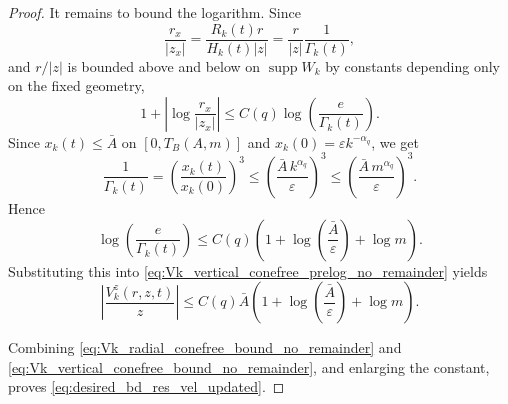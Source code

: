 \documentclass[reqno,11pt]{amsart}
\newcommand{\supp}{\operatorname{supp}}
\begin{document}
\begin{proof}
It remains to bound the logarithm. Since
\[
\frac{r_x}{|z_x|}
=
\frac{R_k(t)r}{H_k(t)|z|}
=
\frac{r}{|z|}\frac{1}{\Gamma_k(t)},
\]
and \(r/|z|\) is bounded above and below on \(\supp W_k\) by constants depending
only on the fixed geometry,
\[
1+\left|\log\frac{r_x}{|z_x|}\right|
\le
C(q)\log\left(\frac{e}{\Gamma_k(t)}\right).
\]
Since \(x_k(t)\le \bar A\) on \([0,T_B(A,m)]\) and
\(x_k(0)=\varepsilon k^{-\alpha_q}\), we get
\[
\frac1{\Gamma_k(t)}
=
\left(\frac{x_k(t)}{x_k(0)}\right)^3
\le
\left(\frac{\bar A\,k^{\alpha_q}}{\varepsilon}\right)^3
\le
\left(\frac{\bar A\,m^{\alpha_q}}{\varepsilon}\right)^3.
\]
Hence
\[
\log\left(\frac{e}{\Gamma_k(t)}\right)
\le
C(q)
\left(
1+\log\left(\frac{\bar A}{\varepsilon}\right)+\log m
\right).
\]
Substituting this into
\eqref{eq:Vk_vertical_conefree_prelog_no_remainder} yields
\begin{equation}
\label{eq:Vk_vertical_conefree_bound_no_remainder}
\left|
\frac{V_k^z(r,z,t)}{z}
\right|
\le
C(q)\bar A
\left(
1+\log\left(\frac{\bar A}{\varepsilon}\right)+\log m
\right).
\end{equation}

Combining
\eqref{eq:Vk_radial_conefree_bound_no_remainder} and
\eqref{eq:Vk_vertical_conefree_bound_no_remainder}, and enlarging the constant,
proves \eqref{eq:desired_bd_res_vel_updated}.
\end{proof}
\end{document}
